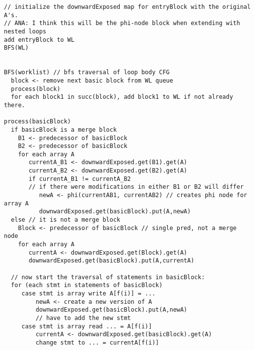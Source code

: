 \documentclass{article}
\begin{document}
\begin{verbatim}
// initialize the downwardExposed map for entryBlock with the original A's.
// ANA: I think this will be the phi-node block when extending with nested loops
add entryBlock to WL
BFS(WL)


BFS(worklist) // bfs traversal of loop body CFG
  block <- remove next basic block from WL queue
  process(block) 
  for each block1 in succ(block), add block1 to WL if not already there. 

process(basicBlock) 
  if basicBlock is a merge block 
    B1 <- predecessor of basicBlock
    B2 <- predecessor of basicBlock
    for each array A
       currentA_B1 <- downwardExposed.get(B1).get(A) 
       currentA_B2 <- downwardExposed.get(B2).get(A) 
       if currentA_B1 != currentA_B2 
       // if there were modifications in either B1 or B2 will differ
          newA <- phi(currentAB1, currentAB2) // creates phi node for array A
          downwardExposed.get(basicBlock).put(A,newA) 
  else // it is not a merge block
    Block <- predecessor of basicBlock // single pred, not a merge node
    for each array A
       currentA <- downwardExposed.get(Block).get(A)
       downwardExposed.get(basicBlock).put(A,currentA)
 
  // now start the traversal of statements in basicBlock:
  for (each stmt in statements of basicBlock)
     case stmt is array write A[f(i)] = ...
         newA <- create a new version of A
         downwardExposed.get(basicBlock).put(A,newA) 
         // have to add the new stmt
     case stmt is array read ... = A[f(i)]
         currentA <- downwardExposed.get(basicBlock).get(A)
         change stmt to ... = currentA[f(i)]
          
\end{verbatim}
\end{document}
